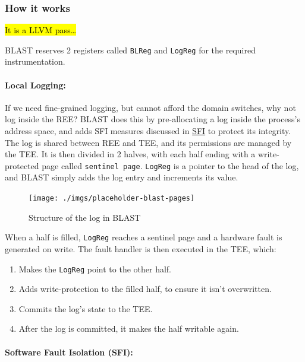 \documentclass[a4paper, nobind]{templates/ociamthesis}
\providecommand{\tightlist}{%
  \setlength{\itemsep}{0pt}\setlength{\parskip}{0pt}}
\begin{document}
\subsubsection{How it works}\label{how-it-works}

\hl{It is a LLVM pass\ldots{}}

BLAST reserves 2 registers called \texttt{BLReg} and \texttt{LogReg} for the required instrumentation.

\paragraph{Local Logging:}\label{local-logging}

If we need fine-grained logging, but cannot afford the domain switches, why not log inside the REE?
BLAST does this by pre-allocating a log inside the process's address space,
and adds SFI measures discussed in \hyperref[blastsfi]{SFI} to protect its integrity.
The log is shared between REE and TEE, and its permissions are managed by the TEE.
It is then divided in 2 halves, with each half ending with a write-protected page called \texttt{sentinel\ page}.
\texttt{LogReg} is a pointer to the head of the log, and BLAST simply adds the log entry
and increments its value.

\begin{figure}[H]

{\centering \texttt{[image: ./imgs/placeholder-blast-pages]} 

}

\caption{Structure of the log in BLAST}\label{fig:blast-log-pages}
\end{figure}

When a half is filled, \texttt{LogReg} reaches a sentinel page and a hardware fault is generated on write.
The fault handler is then executed in the TEE, which:

\begin{enumerate}
\def\labelenumi{\arabic{enumi}.}
\tightlist
\item
  Makes the \texttt{LogReg} point to the other half.
\item
  Adds write-protection to the filled half, to ensure it isn't overwritten.
\item
  Commits the log's state to the TEE.
\item
  After the log is committed, it makes the half writable again.
\end{enumerate}

\paragraph{Software Fault Isolation (SFI):}\label{blastsfi}
\end{document}
